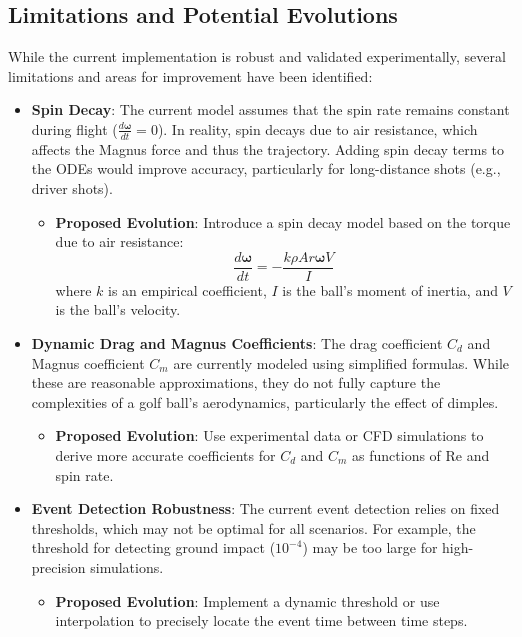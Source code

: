 \documentclass[10pt,a4paper]{report}
\begin{document}
\subsection{Limitations and Potential Evolutions}
\label{subsec:limitations_ode}

While the current implementation is robust and validated experimentally, several limitations and areas for improvement have been identified:

\begin{itemize}
    \item \textbf{Spin Decay}:
    The current model assumes that the spin rate remains constant during flight (\( \frac{d\boldsymbol{\omega}}{dt} = 0 \)). In reality, spin decays due to air resistance, which affects the Magnus force and thus the trajectory. Adding spin decay terms to the ODEs would improve accuracy, particularly for long-distance shots (e.g., driver shots).
    \begin{itemize}
        \item \textbf{Proposed Evolution}: Introduce a spin decay model based on the torque due to air resistance:
        \[
        \frac{d\boldsymbol{\omega}}{dt} = -\frac{k \rho A r \boldsymbol{\omega} V}{I}
        \]
        where \( k \) is an empirical coefficient, \( I \) is the ball's moment of inertia, and \( V \) is the ball's velocity.
    \end{itemize}

    \item \textbf{Dynamic Drag and Magnus Coefficients}:
    The drag coefficient \( C_d \) and Magnus coefficient \( C_m \) are currently modeled using simplified formulas. While these are reasonable approximations, they do not fully capture the complexities of a golf ball's aerodynamics, particularly the effect of dimples.
    \begin{itemize}
        \item \textbf{Proposed Evolution}: Use experimental data or CFD simulations to derive more accurate coefficients for \( C_d \) and \( C_m \) as functions of \( \text{Re} \) and spin rate.
    \end{itemize}

    \item \textbf{Event Detection Robustness}:
    The current event detection relies on fixed thresholds, which may not be optimal for all scenarios. For example, the threshold for detecting ground impact (\( 10^{-4} \)) may be too large for high-precision simulations.
    \begin{itemize}
        \item \textbf{Proposed Evolution}: Implement a dynamic threshold or use interpolation to precisely locate the event time between time steps.
    \end{itemize}


\end{itemize}
\end{document}
